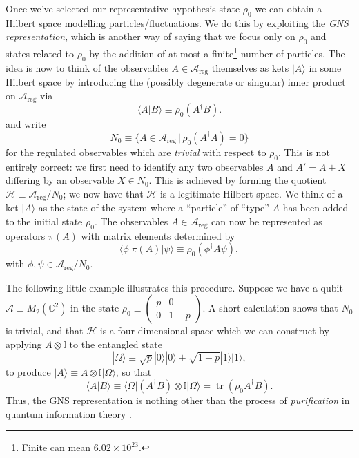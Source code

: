 \documentclass[11pt]{amsart}
\DeclareMathOperator{\tr}{tr}
\theoremstyle{plain}%
\theoremstyle{definition}
\theoremstyle{remark}
\begin{document}
Once we've selected our representative hypothesis state $\rho_0$ we can obtain a Hilbert space modelling particles/fluctuations. We do this by exploiting the \emph{GNS representation}, which is another way of saying that we focus only on $\rho_0$ and states related to $\rho_0$ by the addition of at most a finite\footnote{Finite can mean $6.02\times 10^{23}$.} number of particles. The idea is now to think of the observables $A\in \mathcal{A}_{\text{reg}}$ themselves as kets $|A\rangle$ in some Hilbert space by introducing the (possibly degenerate or singular) inner product on $\mathcal{A}_{\text{reg}}$ via
\begin{equation}
	\langle A|B\rangle \equiv \rho_0 (A^\dag B).
\end{equation}
and write
\begin{equation}
	N_{0} \equiv \{A\in \mathcal{A}_{\text{reg}}\,|\, \rho_0(A^\dag A)=0\}
\end{equation}
for the regulated observables which are \emph{trivial} with respect to $\rho_0$. This is not entirely correct: we first need to identify any two observables $A$ and $A' = A + X$ differing by an observable $X\in N_0$. This is achieved by forming the quotient $\mathcal{H} \equiv \mathcal{A}_{\text{reg}}/N_0$; we now have that $\mathcal{H}$ is a legitimate Hilbert space. We think of a ket $|A\rangle$ as the state of the system where a ``particle'' of ``type'' $A$ has been added to the initial state $\rho_0$. The observables $A\in\mathcal{A}_{\text{reg}}$ can now be represented as operators $\pi(A)$ with matrix elements determined by
\begin{equation}
	\langle \phi|\pi(A)|\psi\rangle \equiv \rho_0(\phi^\dag A \psi),
\end{equation}
with $\phi,\psi \in  \mathcal{A}_{\text{reg}}/N_0$. 

The following little example illustrates this procedure. Suppose we have a qubit $\mathcal{A}\equiv M_2(\mathbb{C}^2)$ in the state $\rho_0 \equiv \left(\begin{smallmatrix}
p&0\\ 0&1-p
\end{smallmatrix}\right)$. A short calculation shows that $N_0$ is trivial, and that $\mathcal{H}$ is a four-dimensional space which we can construct by applying $A\otimes \mathbb{I}$ to the entangled state
\begin{equation}
	|\Omega\rangle \equiv \sqrt{p}|0\rangle|0\rangle + \sqrt{1-p}|1\rangle|1\rangle,
\end{equation}
to produce $|A\rangle \equiv A\otimes\mathbb{I}|\Omega\rangle$, so that  
\begin{equation}
	\langle A|B\rangle \equiv \langle\Omega|(A^\dag B) \otimes \mathbb{I}|\Omega\rangle = \tr(\rho_0 A^\dag B).
\end{equation}
Thus, the GNS representation is nothing other than the process of \emph{purification} in quantum information theory \cite{nielsen_quantum_2000}.
\end{document}
